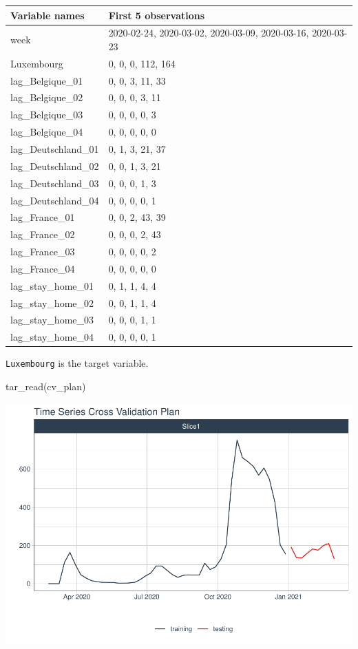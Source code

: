 \documentclass{article}
\newenvironment{Shaded}{\begin{snugshade}}{\end{snugshade}}
\newcommand{\FunctionTok}[1]{\textcolor[rgb]{0.00,0.00,0.00}{#1}}
\newcommand{\NormalTok}[1]{#1}
\begin{document}
\begin{tabular}[t]{ll}
\toprule
Variable names & First 5 observations\\
\midrule
week & 2020-02-24, 2020-03-02, 2020-03-09, 2020-03-16, 2020-03-23\\
Luxembourg & 0,   0,   0, 112, 164\\
lag\_Belgique\_01 & 0,    0,    3,   11,   33\\
lag\_Belgique\_02 & 0,    0,    0,    3,   11\\
lag\_Belgique\_03 & 0,    0,    0,    0,    3\\
\addlinespace
lag\_Belgique\_04 & 0,    0,    0,    0,    0\\
lag\_Deutschland\_01 & 0,   1,   3,  21,  37\\
lag\_Deutschland\_02 & 0,   0,   1,   3,  21\\
lag\_Deutschland\_03 & 0,   0,   0,   1,   3\\
lag\_Deutschland\_04 & 0,   0,   0,   0,   1\\
\addlinespace
lag\_France\_01 & 0,   0,   2,  43,  39\\
lag\_France\_02 & 0,   0,   0,   2,  43\\
lag\_France\_03 & 0,   0,   0,   0,   2\\
lag\_France\_04 & 0,   0,   0,   0,   0\\
lag\_stay\_home\_01 & 0,  1,  1,  4,  4\\
\addlinespace
lag\_stay\_home\_02 & 0,  0,  1,  1,  4\\
lag\_stay\_home\_03 & 0,  0,  0,  1,  1\\
lag\_stay\_home\_04 & 0,  0,  0,  0,  1\\
\bottomrule
\end{tabular}

\texttt{Luxembourg} is the target variable.

\begin{Shaded}
\begin{Highlighting}[]
\FunctionTok{tar\_read}\NormalTok{(cv\_plan)}
\end{Highlighting}
\end{Shaded}

\includegraphics{paper_files/figure-latex/unnamed-chunk-5-1.pdf}
\end{document}
